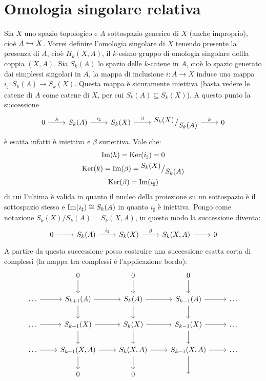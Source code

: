 \section{Omologia singolare relativa}
Sia $ X $ uno spazio topologico e $ A $ sottospazio generico di $ X $ (anche
improprio), cioè $ A \xhookrightarrow{} X$. Vorrei definire l'omologia singolare di $ X $ tenendo
presente la presenza di $ A $, cioè $ H_k(X,A) $, il $ k $-esimo gruppo di
omologia singolare dellla coppia $ (X, A) $. Sia $ S_k(A) $ lo spazio delle
$ k $-catene in $ A $, cioè lo spazio generato dai simplessi singolari in $ A $,
la mappa di inclusione $ i \colon A \to X $ induce una mappa
$ i_\sharp \colon S_k(A) \to S_k(X) $. Questa mappa è sicuramente iniettiva (basta vedere le
catene di $ A $ come catene di $ X $, per cui $ S_k(A) \subseteq S_k(X) $). A questo
punto la successione
\[
  \begin{tikzcd}
    0 \arrow{r}{h} & S_k(A) \arrow{r}{i_\sharp} & S_k(X) \arrow{r}{\beta} & \quot{S_k(X)}{S_k(A)} \arrow{r}{k} & 0
  \end{tikzcd}
\]
è esatta infatti $ h $ iniettiva e $ \beta $ suriettiva. Vale che:
\begin{gather*}
  \mathrm{Im}( h ) = \mathrm{Ker}( i_\sharp) = 0  \\
  \mathrm{Ker}( k) = \mathrm{Im}( \beta ) = {^{\textstyle S_k(X)}\big/_{\textstyle S_k(A)}} \\
  \mathrm{Ker}( \beta) = \mathrm{Im}( i_\sharp )
\end{gather*}
di cui l'ultima è valida in quanto il nucleo della proiezione su un sottospazio
è il sottospazio stesso e $ \mathrm{Im}( i_\sharp ) \cong S_k(A) $ in quanto $ i_\sharp $ è iniettiva.
Pongo come notazione $ {S_k(X)} \slash {S_k(A)} = S_k(X, A) $, in questo modo la
successione diventa:
\[
  \begin{tikzcd}
    0 \arrow{r}{} & S_k(A) \arrow{r}{i_\sharp} & S_k(X) \arrow{r}{\beta} & S_k(X,A) \arrow{r}{} & 0
  \end{tikzcd}
\]
A partire da questa successione posso costruire una successione esatta corta di
complessi (la mappa tra complessi è l'applicazione bordo):
\[
  \begin{tikzcd}
    {} & 0 \arrow{d}{} & 0 \arrow{d}{} & 0 \arrow{d}{} \\
    \dots \arrow{r}{} & S_{k+1}(A) \arrow{r}{} \arrow{d}{} &   S_k(A) \arrow{r}{} \arrow{d}{}   & S_{k-1}(A) \arrow{r}{} \arrow{d}{}  & \dots \\
    \dots \arrow{r}{} & S_{k+1}(X) \arrow{r}{} \arrow{d}{} &   S_k(X) \arrow{r}{} \arrow{d}{}   & S_{k-1}(X) \arrow{r}{} \arrow{d}{}  & \dots \\
    \dots \arrow{r}{} & S_{k+1}(X,A) \arrow{r}{} \arrow{d}{} & S_k(X,A) \arrow{r}{} \arrow{d}{} & S_{k-1}(X,A) \arrow{r}{} \arrow{d}{} & \dots \\
    {} & 0 & 0 & {}
  \end{tikzcd}
\]
